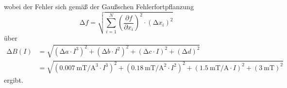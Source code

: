 wobei der Fehler sich gemäß der Gaußschen Fehlerfortpflanzung
\begin{equation}
  \increment f = \sqrt{ \sum_{i=1}^N \left( \frac{\partial f}{\partial x_i}\right)^2
  \cdot (\increment x_i)^2  }
  \label{eqn:gaus}
\end{equation}
über
\begin{equation}
  \begin{split}
  \increment B(I) &= \sqrt{ \left( \increment a \cdot I^3 \right)^2 + \left( \increment b \cdot I^2 \right)^2
  + \left( \increment c \cdot I \right)^2 + \left( \increment d \right)^2} \\\
  &= \sqrt{ \left( \SI{0.007}{\milli\tesla\per\cubic\ampere} \cdot I^3 \right)^2 +
  \left(  \SI{0.18}{\milli\tesla\per\square\ampere} \cdot I^2 \right)^2
  + \left( \SI{1.5}{\milli\tesla\per\ampere} \cdot I \right)^2 +
  \left( \SI{3}{\milli\tesla} \right)^2}
  \label{eqn:fbfeld}
\end{split}
\end{equation}
ergibt.
